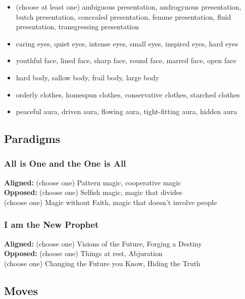 \documentclass[10pt,twoside,openright]{memoir}
\begin{document}
\begin{itemize}
\tightlist
\item
  (choose at least one) ambiguous presentation, androgynous
  presentation, butch presentation, concealed presentation, femme
  presentation, fluid presentation, transgressing presentation
\item
  caring eyes, quiet eyes, intense eyes, small eyes, inspired eyes, hard
  eyes
\item
  youthful face, lined face, sharp face, round face, marred face, open
  face
\item
  hard body, sallow body, frail body, large body
\item
  orderly clothes, homespun clothes, conservative clothes, starched
  clothes
\item
  peaceful aura, driven aura, flowing aura, tight-fitting aura, hidden
  aura
\end{itemize}

\hypertarget{paradigms-4}{%
\subsection{Paradigms}\label{paradigms-4}}

\hypertarget{all-is-one-and-the-one-is-all}{%
\subsubsection{All is One and the One is
All}\label{all-is-one-and-the-one-is-all}}

\textbf{Aligned:} (choose one) Pattern magic, cooperative magic\\
\textbf{Opposed:} (choose one) Selfish magic, magic that divides\\
(choose one) Magic without Faith, magic that doesn't involve people

\hypertarget{i-am-the-new-prophet}{%
\subsubsection{I am the New Prophet}\label{i-am-the-new-prophet}}

\textbf{Aligned:} (choose one) Visions of the Future, Forging a
Destiny\\
\textbf{Opposed:} (choose one) Things at rest, Abjuration\\
(choose one) Changing the Future you Know, Hiding the Truth

\hypertarget{moves-4}{%
\subsection{Moves}\label{moves-4}}
\end{document}
